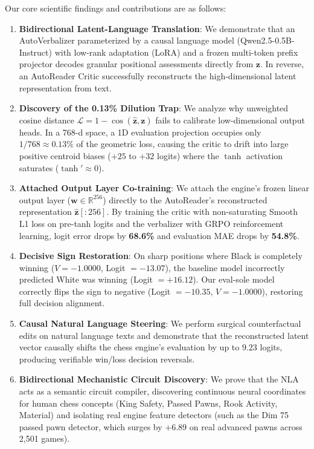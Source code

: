 \documentclass[10pt,twocolumn]{article}
\begin{document}
Our core scientific findings and contributions are as follows:
\begin{enumerate}
    \item \textbf{Bidirectional Latent-Language Translation}: We demonstrate that an AutoVerbalizer parameterized by a causal language model (Qwen2.5-0.5B-Instruct) with low-rank adaptation (LoRA) and a frozen multi-token prefix projector decodes granular positional assessments directly from $\mathbf{z}$. In reverse, an AutoReader Critic successfully reconstructs the high-dimensional latent representation from text.
    \item \textbf{Discovery of the 0.13\% Dilution Trap}: We analyze why unweighted cosine distance $\mathcal{L} = 1 - \cos(\hat{\mathbf{z}}, \mathbf{z})$ fails to calibrate low-dimensional output heads. In a 768-d space, a 1D evaluation projection occupies only $1/768 \approx 0.13\%$ of the geometric loss, causing the critic to drift into large positive centroid biases ($+25$ to $+32$ logits) where the $\tanh$ activation saturates ($\tanh' \approx 0$).
    \item \textbf{Attached Output Layer Co-training}: We attach the engine's frozen linear output layer ($\mathbf{w} \in \mathbb{R}^{256}$) directly to the AutoReader's reconstructed representation $\hat{\mathbf{z}}[:256]$. By training the critic with non-saturating Smooth L1 loss on pre-tanh logits and the verbalizer with GRPO reinforcement learning, logit error drops by \textbf{68.6\%} and evaluation MAE drops by \textbf{54.8\%}.
    \item \textbf{Decisive Sign Restoration}: On sharp positions where Black is completely winning ($V = -1.0000$, Logit $=-13.07$), the baseline model incorrectly predicted White was winning (Logit $=+16.12$). Our eval-sole model correctly flips the sign to negative (Logit $=-10.35$, $V = -1.0000$), restoring full decision alignment.
    \item \textbf{Causal Natural Language Steering}: We perform surgical counterfactual edits on natural language texts and demonstrate that the reconstructed latent vector causally shifts the chess engine's evaluation by up to $9.23$ logits, producing verifiable win/loss decision reversals.
    \item \textbf{Bidirectional Mechanistic Circuit Discovery}: We prove that the NLA acts as a semantic circuit compiler, discovering continuous neural coordinates for human chess concepts (King Safety, Passed Pawns, Rook Activity, Material) and isolating real engine feature detectors (such as the Dim 75 passed pawn detector, which surges by $+6.89$ on real advanced pawns across 2,501 games).
\end{enumerate}
\end{document}
